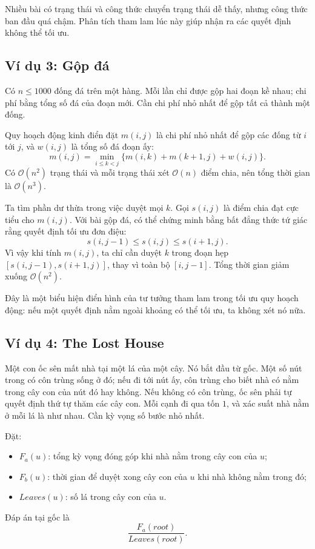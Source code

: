 \documentclass[11pt]{article}
\newcommand{\Oh}{\mathcal{O}}
\begin{document}
Nhiều bài có trạng thái và công thức chuyển trạng thái dễ thấy, nhưng công
thức ban đầu quá chậm. Phân tích tham lam lúc này giúp nhận ra các quyết định
không thể tối ưu.

\subsection{Ví dụ 3: Gộp đá}

Có \(n\le 1000\) đống đá trên một hàng. Mỗi lần chỉ được gộp hai đoạn kề nhau;
chi phí bằng tổng số đá của đoạn mới. Cần chi phí nhỏ nhất để gộp tất cả thành
một đống.

Quy hoạch động kinh điển đặt \(m(i,j)\) là chi phí nhỏ nhất để gộp các đống từ
\(i\) tới \(j\), và \(w(i,j)\) là tổng số đá đoạn ấy:
\[
  m(i,j)=\min_{i\le k<j}\{m(i,k)+m(k+1,j)+w(i,j)\}.
\]
Có \(\Oh(n^2)\) trạng thái và mỗi trạng thái xét \(\Oh(n)\) điểm chia, nên
tổng thời gian là \(\Oh(n^3)\).

Ta tìm phần dư thừa trong việc duyệt mọi \(k\). Gọi \(s(i,j)\) là điểm chia
đạt cực tiểu cho \(m(i,j)\). Với bài gộp đá, có thể chứng minh bằng bất đẳng
thức tứ giác rằng quyết định tối ưu đơn điệu:
\[
  s(i,j-1)\le s(i,j)\le s(i+1,j).
\]
Vì vậy khi tính \(m(i,j)\), ta chỉ cần duyệt \(k\) trong đoạn hẹp
\([s(i,j-1),s(i+1,j)]\), thay vì toàn bộ \([i,j-1]\). Tổng thời gian giảm xuống
\(\Oh(n^2)\).

Đây là một biểu hiện điển hình của tư tưởng tham lam trong tối ưu quy hoạch
động: nếu một quyết định nằm ngoài khoảng có thể tối ưu, ta không xét nó nữa.

\subsection{Ví dụ 4: The Lost House}

Một con ốc sên mất nhà tại một lá của một cây. Nó bắt đầu từ gốc. Một số nút
trong có côn trùng sống ở đó; nếu đi tới nút ấy, côn trùng cho biết nhà có nằm
trong cây con của nút đó hay không. Nếu không có côn trùng, ốc sên phải tự
quyết định thứ tự thăm các cây con. Mỗi cạnh đi qua tốn \(1\), và xác suất nhà
nằm ở mỗi lá là như nhau. Cần kỳ vọng số bước nhỏ nhất.

Đặt:
\begin{itemize}
  \item \(F_a(u)\): tổng kỳ vọng đóng góp khi nhà nằm trong cây con của \(u\);
  \item \(F_b(u)\): thời gian để duyệt xong cây con của \(u\) khi nhà không nằm
  trong đó;
  \item \(Leaves(u)\): số lá trong cây con của \(u\).
\end{itemize}
Đáp án tại gốc là
\[
  \frac{F_a(root)}{Leaves(root)}.
\]
\end{document}
